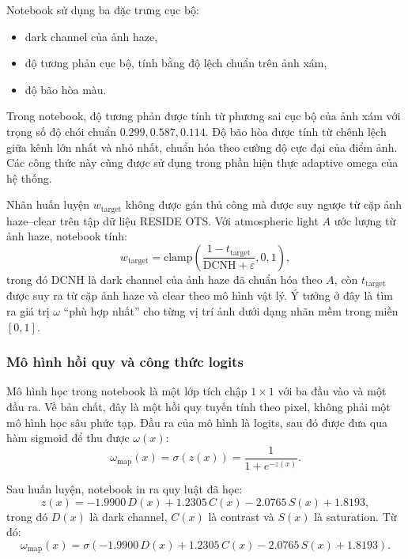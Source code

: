 Notebook sử dụng ba đặc trưng cục bộ:
\begin{itemize}
\item dark channel của ảnh haze,
\item độ tương phản cục bộ, tính bằng độ lệch chuẩn trên ảnh xám,
\item độ bão hòa màu.
\end{itemize}

Trong notebook, độ tương phản được tính từ phương sai cục bộ của ảnh xám với trọng số độ chói chuẩn \(0.299, 0.587, 0.114\). Độ bão hòa được tính từ chênh lệch giữa kênh lớn nhất và nhỏ nhất, chuẩn hóa theo cường độ cực đại của điểm ảnh. Các công thức này cũng được sử dụng trong phần hiện thực adaptive omega của hệ thống.

Nhãn huấn luyện \(w_{\text{target}}\) không được gán thủ công mà được suy ngược từ cặp ảnh haze--clear trên tập dữ liệu RESIDE OTS. Với atmospheric light \(A\) ước lượng từ ảnh haze, notebook tính:
\begin{equation}
w_{\text{target}} = \mathrm{clamp}\left(\frac{1 - t_{\text{target}}}{\mathrm{DCNH} + \varepsilon}, 0, 1\right),
\end{equation}
trong đó \(\mathrm{DCNH}\) là dark channel của ảnh haze đã chuẩn hóa theo \(A\), còn \(t_{\text{target}}\) được suy ra từ cặp ảnh haze và clear theo mô hình vật lý. Ý tưởng ở đây là tìm ra giá trị \(\omega\) ``phù hợp nhất'' cho từng vị trí ảnh dưới dạng nhãn mềm trong miền \([0,1]\).

\subsubsection{Mô hình hồi quy và công thức logits}

Mô hình học trong notebook là một lớp tích chập \(1\times1\) với ba đầu vào và một đầu ra. Về bản chất, đây là một hồi quy tuyến tính theo pixel, không phải một mô hình học sâu phức tạp. Đầu ra của mô hình là logits, sau đó được đưa qua hàm sigmoid để thu được \(\omega(x)\):
\begin{equation}
\omega_{\mathrm{map}}(x)=\sigma(z(x))=\frac{1}{1+e^{-z(x)}}.
\end{equation}

Sau huấn luyện, notebook in ra quy luật đã học:
\begin{equation}
z(x) = -1.9900\,D(x) + 1.2305\,C(x) - 2.0765\,S(x) + 1.8193,
\end{equation}
trong đó \(D(x)\) là dark channel, \(C(x)\) là contrast và \(S(x)\) là saturation. Từ đó:
\begin{equation}
\omega_{\mathrm{map}}(x)=\sigma\left(-1.9900\,D(x)+1.2305\,C(x)-2.0765\,S(x)+1.8193\right).
\end{equation}

